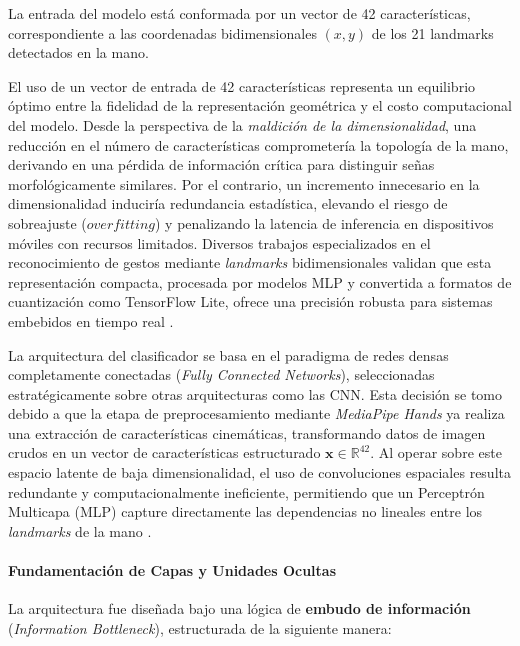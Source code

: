 	La entrada del modelo está conformada por un vector de 42 características, correspondiente a las coordenadas bidimensionales $(x,y)$ de los 21 landmarks detectados en la mano. 
	
	El uso de un vector de entrada de 42 características representa un equilibrio óptimo entre la fidelidad de la representación geométrica y el costo computacional del modelo. Desde la perspectiva de la \textit{maldición de la dimensionalidad}, una reducción en el número de características comprometería la topología de la mano, derivando en una pérdida de información crítica para distinguir señas morfológicamente similares. Por el contrario, un incremento innecesario en la dimensionalidad induciría redundancia estadística, elevando el riesgo de sobreajuste ($overfitting$) y penalizando la latencia de inferencia en dispositivos móviles con recursos limitados. Diversos trabajos especializados en el reconocimiento de gestos mediante \textit{landmarks} bidimensionales validan que esta representación compacta, procesada por modelos MLP y convertida a formatos de cuantización como TensorFlow Lite, ofrece una precisión robusta para sistemas embebidos en tiempo real \cite{Kumar2025GestureMLP, Goodfellow2016}.
	
	La arquitectura del clasificador se basa en el paradigma de redes densas completamente conectadas (\textit{Fully Connected Networks}), seleccionadas estratégicamente sobre otras arquitecturas como las CNN. Esta decisión se tomo debido a que la etapa de preprocesamiento mediante \textit{MediaPipe Hands} ya realiza una extracción de características cinemáticas, transformando datos de imagen crudos en un vector de características estructurado $\mathbf{x} \in \mathbb{R}^{42}$. Al operar sobre este espacio latente de baja dimensionalidad, el uso de convoluciones espaciales resulta redundante y computacionalmente ineficiente, permitiendo que un Perceptrón Multicapa (MLP) capture directamente las dependencias no lineales entre los \textit{landmarks} de la mano \cite{Goodfellow2016}.
	
	\paragraph{Fundamentación de Capas y Unidades Ocultas}
	La arquitectura fue diseñada bajo una lógica de \textbf{embudo de información} (\textit{Information Bottleneck}), estructurada de la siguiente manera:
	
